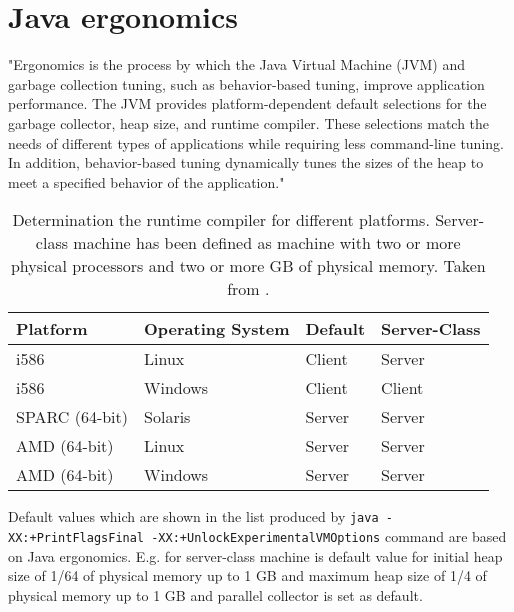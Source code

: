 \documentclass[
  digital, %
  oneside,
  notable, %
  nolof,     %
  nolot     %
]{fithesis3}
\begin{document}
\section{Java ergonomics}\label{erg}
"Ergonomics is the process by which the Java Virtual Machine (JVM) and garbage collection tuning, such as behavior-based tuning, improve application performance. The JVM provides platform-dependent default selections for the garbage collector, heap size, and runtime compiler. These selections match the needs of different types of applications while requiring less command-line tuning. In addition, behavior-based tuning dynamically tunes the sizes of the heap to meet a specified behavior of the application." \cite{ergonomics}

\begin{table}[]
	\centering
	\begin{tabular}{|l|l|l|l|}
		\hline
		\textbf{Platform} & \textbf{Operating System} & \textbf{Default} & \textbf{Server-Class} \\ \hline
		i586              & Linux                     & Client           & Server                           \\ \hline
		i586              & Windows                   & Client           & Client                           \\ \hline
		SPARC (64-bit)    & Solaris                   & Server           & Server                           \\ \hline
		AMD (64-bit)      & Linux                     & Server           & Server                           \\ \hline
		AMD (64-bit)      & Windows                   & Server           & Server                           \\ \hline
	\end{tabular}
	\caption{Determination the runtime compiler for different platforms. Server-class machine has been defined as machine with two or more physical processors and two or more GB of physical memory. Taken from \cite{ergonomics}.}
	\label{my-label}
\end{table}

Default values which are shown in the list produced by \texttt{java -XX:+PrintFlagsFinal -XX:+UnlockExperimentalVMOptions} command are based on Java ergonomics. E.g. for server-class machine is default value for initial heap size of 1/64 of physical memory up to 1 GB and maximum heap size of 1/4 of physical memory up to 1 GB and parallel collector is set as default. \cite{ergonomics}
\end{document}
